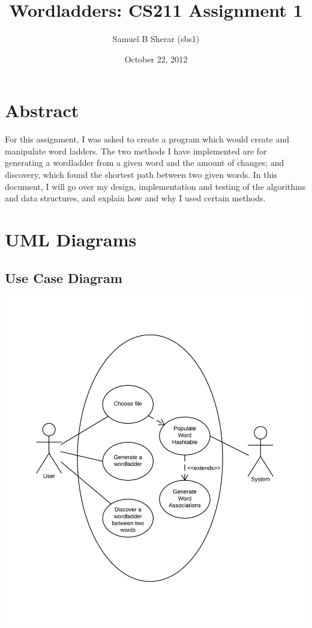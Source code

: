 \documentclass[10pt, a4paper]{article}
\begin{document}
\title{Wordladders: CS211 Assignment 1}
\date{October 22, 2012}
\author{Samuel B Sherar (sbs1)}

\maketitle
\newpage

\tableofcontents

\newpage

\section{Abstract}

For this assignment, I was asked to create a program which would create and manipulate word ladders. The two methods I have implemented are for generating a wordladder from a given word and the amount of changes; and discovery, which found the shortest path between two given words. In this document, I will go over my design, implementation and testing of the algorithms and data structures, and explain how and why I used certain methods.

\section{UML Diagrams}

\subsection{Use Case Diagram}

\includegraphics{./images/usecase.png}
\end{document}
